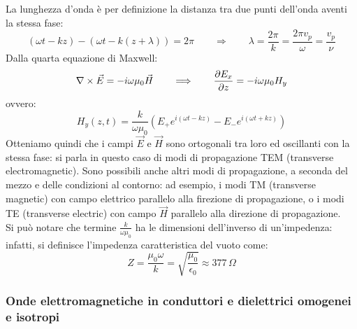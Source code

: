 La lunghezza d'onda è per definizione la distanza tra due punti dell'onda aventi la stessa fase:
\begin{equation}
	(\omega t - kz) - (\omega t - k (z + \lambda)) = 2\pi \qquad\Longrightarrow\qquad \lambda = \frac{2\pi}{k} = \frac{2\pi v_p}{\omega} = \frac{v_p}{\nu}
	\label{eq:14}
\end{equation}
Dalla quarta equazione di Maxwell:
\begin{equation}
	\nabla\times\vec{E} = -i\omega \mu_0 \vec{H} \qquad\Longrightarrow\qquad \frac{\partial E_x}{\partial z} = -i\omega \mu_0 H_y
	\label{eq:15}
\end{equation}
ovvero:
\begin{equation}
	H_y (z,t) = \frac{k}{\omega \mu_0} \left(E_+ e^{i(\omega t - kz)} - E_- e^{i(\omega t + kz)}\right)
	\label{eq:16}
\end{equation}
Otteniamo quindi che i campi $ \vec{E} $ e $ \vec{H} $ sono ortogonali tra loro ed oscillanti con la stessa fase: si parla in questo caso di modi di propagazione TEM (transverse electromagnetic). Sono possibili anche altri modi di propagazione, a seconda del mezzo e delle condizioni al contorno: ad esempio, i modi TM (transverse magnetic) con campo elettrico parallelo alla firezione di propagazione, o i modi TE (transverse electric) con campo $ \vec{H} $ parallelo alla direzione di propagazione. \\ 
%
Si può notare che termine $ \frac{k}{\omega\mu_0} $ ha le dimensioni dell'inverso di un'impedenza: infatti, si definisce l'impedenza caratteristica del vuoto come:
\begin{equation}
	Z = \frac{\mu_0 \omega}{k} = \sqrt{\frac{\mu_0}{\epsilon_0}} \approx 377 \,\Omega
	\label{eq:17}
\end{equation}

\subsubsection{Onde elettromagnetiche in conduttori e dielettrici omogenei e isotropi}

